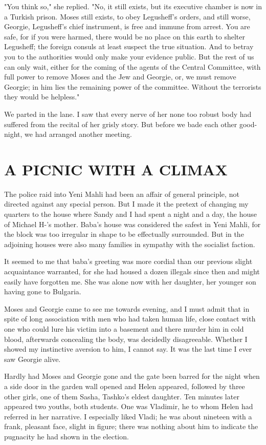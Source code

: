 \documentclass[a5paper,12pt]{book}
\begin{document}
"You think so," she replied. "No, it still exists, but its executive chamber is now in a Turkish prison. Moses still exists, to obey Legusheff’s orders, and still worse, Georgie, Legusheff’s chief instrument, is free and immune from arrest. You are safe, for if you were harmed, there would be no place on this earth to shelter Legusheff; the foreign consuls at least suspect the true situation. And to betray you to the authorities would only make your evidence public. But the rest of us can only wait, either for the coming of the agents of the Central Committee, with full power to remove Moses and the Jew and Georgie, or, we must remove Georgie; in him lies the remaining power of the committee. Without the terrorists they would be helpless."

We parted in the lane. I saw that every nerve of her none too robust body had suffered from the recital of her grisly story. But before we bade each other good-night, we had arranged another meeting.


\chapter{A PICNIC WITH A CLIMAX}

The police raid into Yeni Mahli had been an affair of general principle, not directed against any special person. But I made it the pretext of changing my quarters to the house where Sandy and I had spent a night and a day, the house of Michael H-'s mother. Baba’s house was considered the safest in Yeni Mahli, for the block was too irregular in shape to be effectually surrounded. But in the adjoining houses were also many families in sympathy with the socialist faction.

It seemed to me that baba’s greeting was more cordial than our previous slight acquaintance warranted, for she had housed a dozen illegals since then and might easily have forgotten me. She was alone now with her daughter, her younger son having gone to Bulgaria.

Moses and Georgie came to see me towards evening, and I must admit that in spite of long association with men who had taken human life, close contact with one who could lure his victim into a basement and there murder him in cold blood, afterwards concealing the body, was decidedly disagreeable. Whether I showed my instinctive aversion to him, I cannot say. It was the last time I ever saw Georgie alive.

Hardly had Moses and Georgie gone and the gate been barred for the night when a side door in the garden wall opened and Helen appeared, followed by three other girls, one of them Sasha, Tashko’s eldest daughter. Ten minutes later appeared two youths, both students. One was Vladimir, he to whom Helen had referred in her narrative. I especially liked Vladi; he was about nineteen with a frank, pleasant face, slight in figure; there was nothing about him to indicate the pugnacity he had shown in the election.
\end{document}
